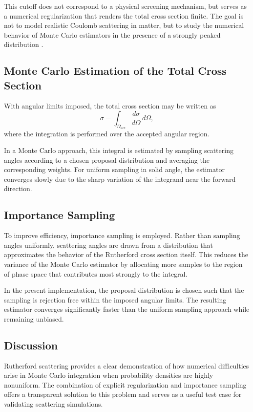 \documentclass[11pt,a4paper]{article}
\begin{document}
This cutoff does not correspond to a physical screening mechanism, but serves as a
numerical regularization that renders the total cross section finite. The goal is not
to model realistic Coulomb scattering in matter, but to study the numerical behavior of
Monte Carlo estimators in the presence of a strongly peaked distribution \cite{press2007numerical,james_monte_1980}.

\subsection{Monte Carlo Estimation of the Total Cross Section}

With angular limits imposed, the total cross section may be written as
\begin{equation}
\sigma = \int_{\Omega_{\text{acc}}}
\frac{d\sigma}{d\Omega} \, d\Omega ,
\end{equation}
where the integration is performed over the accepted angular region.

In a Monte Carlo approach, this integral is estimated by sampling scattering angles
according to a chosen proposal distribution and averaging the corresponding weights.
For uniform sampling in solid angle, the estimator converges slowly due to the sharp
variation of the integrand near the forward direction.

\subsection{Importance Sampling}

To improve efficiency, importance sampling is employed. Rather than sampling angles
uniformly, scattering angles are drawn from a distribution that approximates the
behavior of the Rutherford cross section itself. This reduces the variance of the
Monte Carlo estimator by allocating more samples to the region of phase space that
contributes most strongly to the integral.

In the present implementation, the proposal distribution is chosen such that the
sampling is rejection free within the imposed angular limits. The resulting estimator
converges significantly faster than the uniform sampling approach while remaining
unbiased.

\subsection{Discussion}

Rutherford scattering provides a clear demonstration of how numerical difficulties
arise in Monte Carlo integration when probability densities are highly nonuniform.
The combination of explicit regularization and importance sampling offers a transparent
solution to this problem and serves as a useful test case for validating scattering
simulations.
\end{document}
